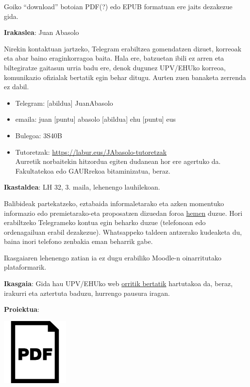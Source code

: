 \documentclass[
]{book}
\providecommand{\tightlist}{%
  \setlength{\itemsep}{0pt}\setlength{\parskip}{0pt}}
\begin{document}
Goiko ``download'' botoian PDF(?) edo EPUB formatuan ere jaits dezakezue gida.

\textbf{Irakaslea}: Juan Abasolo

Nirekin kontaktuan jartzeko, Telegram erabiltzea gomendatzen dizuet, korreoak eta abar baino eraginkorragoa baita. Hala ere, batzuetan ibili ez arren eta biltegiratze gaitasun urria badu ere, denok dugunez UPV/EHUko korreoa, komunikazio ofizialak bertatik egin behar ditugu. Aurten zuen banaketa zerrenda ez dabil.

\begin{itemize}
\tightlist
\item
  Telegram: {[}abildua{]} JuanAbasolo
\item
  emaila: juan {[}puntu{]} abasolo {[}abildua{]} ehu {[}puntu{]} eus
\item
  Bulegoa: 3S40B
\item
  Tutoretzak: \url{https://labur.eus/JAbasolo-tutoretzak}\\
  Aurretik norbaitekin hitzordua egiten dudanean hor ere agertuko da. Fakultatekoa edo GAURrekoa bitaminizatua, beraz.
\end{itemize}

\textbf{Ikastaldea}: LH 32, 3. maila, lehenengo lauhilekoan.

Balibideak partekatzeko, eztabaida informaletarako eta azken momentuko informazio edo premietarako-eta proposatzen dizuedan foroa \href{https://t.me/joinchat/CheQnxAMdJ206V3d4kDLkw}{hemen} duzue. Hori erabiltzeko Telegrameko kontua egin beharko duzue (telefonoan edo ordenagailuan erabil dezakezue). Whatsappeko taldeen antzerako kudeaketa du, baina inori telefono zenbakia eman beharrik gabe.

Ikasgaiaren lehenengo zatian ia ez dugu erabiliko Moodle-n oinarritutako plataformarik.

\textbf{Ikasgaia}: Gida hau UPV/EHUko web \href{https://www.ehu.eus/eu/lehen-hezkuntzako-gradua-bizkaia/kreditu-eta-irakasgaiak?p_redirect=consultaAsignatura\&p_cod_proceso=egr\&p_anyo_acad=20180\&p_ciclo=X\&p_curso=3\&p_cod_asignatura=25868}{orritik bertatik} hartutakoa da, beraz, irakurri eta aztertuta baduzu, hurrengo pausura iragan.

\textbf{Proiektua}:

\href{syllabusa/Syllabus_HDLH20-V1.pdf}{\includegraphics{assets/pdficon.png}}
\end{document}
